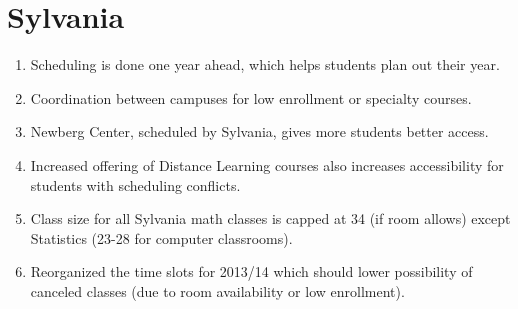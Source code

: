 \section*{Sylvania}
\begin{enumerate}
    \item  Scheduling is done one year ahead, which helps students plan out
      their year.
    \item  Coordination between campuses for low enrollment or specialty
      courses.
    \item  Newberg Center, scheduled by Sylvania, gives more students better
      access.
    \item  Increased offering of Distance Learning courses also increases
      accessibility for students with scheduling conflicts.
	\item  Class size for all Sylvania math classes is capped at 34 (if room allows) except
    Statistics (23-28 for computer classrooms).
	\item  Reorganized the time slots for 2013/14 which should lower possibility of canceled classes (due 
	to room availability or low enrollment).
\end{enumerate}

